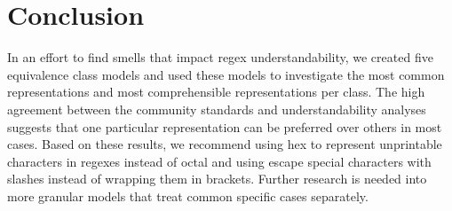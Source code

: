 \section{Conclusion}
\label{sec:conclusion}
In an effort to find smells that impact regex understandability, we created five equivalence class models and used these models to investigate the most common representations and most comprehensible representations per class. 
The high agreement between the community standards and understandability analyses suggests that one particular representation can be preferred over others in most cases. 
Based on these results, we recommend using hex to represent unprintable characters in regexes instead of octal and using escape special characters with slashes instead of wrapping them in brackets. Further research is needed into more granular models that treat common specific cases separately. %
